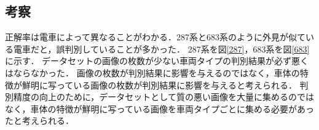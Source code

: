 \begin{multicols*}{2}
\subsection{考察}
正解率は電車によって異なることがわかる．287系と683系のように外見が似ている電車だと，誤判別していることが多かった．
287系を図\ref{287}，683系を図\ref{683}に示す．
データセットの画像の枚数が少ない車両タイプの判別結果が必ず悪くはならなかった．
画像の枚数が判別結果に影響を与えるのではなく，車体の特徴が鮮明に写っている画像の枚数が判別結果に影響を与えると考えられる．
判別精度の向上のために，データセットとして質の悪い画像を大量に集めるのではなく，車体の特徴が鮮明に写っている画像を車両タイプごとに集める必要があったと考えられる．


\end{multicols*}
